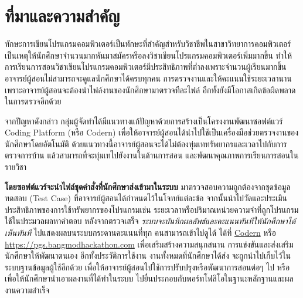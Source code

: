 \documentclass[12pt,oneside,openright,a4paper]{cpe-thai-project}
\begin{document}
\section{ที่มาและความสำคัญ}
    \begin{flushleft}
        ทักษะการเขียนโปรแกรมคอมพิวเตอร์เป็นทักษะที่สำคัญสำหรับวิชาชีพในสาขาวิทยาการคอมพิวเตอร์ เป็นเหตุให้นักศึกษาจำนวนมากหันมาสมัครหรือลงวิชาเขียนโปรแกรมคอมพิวเตอร์เพิ่มมากขึ้น ทำให้การเรียนการสอนวิชาเขียนโปรแกรมคอมพิวเตอร์มีประสิทธิภาพที่ต่ำลงเพราะจำนวนผู้เรียนมากขึ้น อาจารย์ผู้สอนไม่สามารถจะดูแลนักศึกษาได้ครบทุกคน การตรวจงานและให้คะแนนใช้ระยะเวลานาน เพราะอาจารย์ผู้สอนจะต้องนำไฟล์งานของนักศึกษามาตรวจทีละไฟล์ อีกทั้งยังมีโอกาสเกิดข้อผิดพลาดในการตรวจอีกด้วย
    \end{flushleft}
    \begin{flushleft}
        จากปัญหาดังกล่าว กลุ่มผู้จัดทำได้มีแนวทางแก้ปัญหาด้วยการสร้างเป็นโครงงานพัฒนาซอฟต์แวร์ Coding Platform (หรือ Codern) เพื่อให้อาจารย์ผู้สอนได้นำไปใช้เป็นเครื่องมือช่วยตรวจงานของนักศึกษาโดยอัตโนมัติ ด้วยแนวทางนี้อาจารย์ผู้สอนจะได้ไม่ต้องทุ่มเททรัพยากรและเวลาไปกับการตรวจการบ้าน แล้วสามารถที่จะทุ่มเทไปยังงานในด้านการสอน และพัฒนาคุณภาพการเรียนการสอนในรายวิชา
    \end{flushleft}

    \begin{flushleft}
        \textbf{โดยซอฟต์แวร์จะนำไฟล์ชุดคำสั่งที่นักศึกษาส่งเข้ามาในระบบ} มาตรวจสอบความถูกต้องจากชุดข้อมูลทดสอบ (Test Case) ที่อาจารย์ผู้สอนได้กำหนดไว้ในโจทย์แต่ละข้อ จากนั้นนำไปวัดและประเมินประสิทธิภาพของการใช้ทรัพยากรของโปรแกรมเช่น ระยะเวลาหรือปริมาณหน่วยความจำที่ถูกโปรแกรมใช้ในประมวลผลหาคำตอบ หลังจากตรวจเสร็จ \textit{ระบบจะบันทึกผลลัพธ์และคะแนนทันทีให้นักศึกษาได้เห็นทันที} ไปแสดงผลบนระบบกระดานคะแนนที่ทุก
        คนสามารถเข้าไปดูได้ ได้ที่ \href{https://codern.app}{Codern} หรือ \url{https://pgs.bangmodhackathon.com} เพื่อเสริมสร้างความสนุกสนาน การแข่งขันและส่งเสริมนักศึกษาให้พัฒนาตนเอง อีกทั้งประวัติการใช้งาน งานทั้งหมดที่นักศึกษาได้ส่ง จะถูกนำไปเก็บไว้ในระบบฐานข้อมูลผู้ใช้อีกด้วย เพื่อให้อาจารย์ผู้สอนไปใช้การปรับปรุงหรือพัฒนาการสอนต่อๆ ไป หรือเพื่อให้นักศึกษานำเอาผลงานที่ได้ทำในระบบ ไปยื่นประกอบกับพอร์ทโฟลิโอในฐานะหลักฐานและผลงานความสำเร็จ
    \end{flushleft}
    
\end{document}
